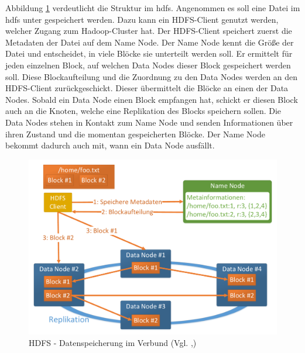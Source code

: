 \noindent
Abbildung \ref{fig:hdfs_cluster_architecture} verdeutlicht die Struktur im \gls{hdfs}. Angenommen es soll eine Datei im \gls{hdfs} unter  gespeichert werden. Dazu kann ein HDFS-Client genutzt werden, welcher Zugang zum Hadoop-Cluster hat. Der HDFS-Client speichert zuerst die Metadaten der Datei auf dem Name Node. Der Name Node kennt die Größe der Datei und entscheidet, in viele Blöcke sie unterteilt werden soll. Er ermittelt für jeden einzelnen Block, auf welchen Data Nodes dieser Block gespeichert werden soll. Diese Blockaufteilung und die Zuordnung zu den Data Nodes werden an den HDFS-Client zurückgeschickt. Dieser übermittelt die Blöcke an einen der Data Nodes. Sobald ein Data Node einen Block empfangen hat, schickt er diesen Block auch an die Knoten, welche eine Replikation des Blocks speichern sollen. Die Data Nodes stehen in Kontakt zum Name Node und senden Informationen über ihren Zustand und die momentan gespeicherten Blöcke. Der Name Node bekommt dadurch auch mit, wann ein Data Node ausfällt.

\begin{figure}[ht]
  \centering
  \includegraphics[width=\textwidth]{./resource/hdfs_cluster_architecture.pdf}
  \caption{HDFS - Datenspeicherung im Verbund (Vgl. \cite{hdfs_architecture},\cite{expert_hadoop_admin})}
  \label{fig:hdfs_cluster_architecture}
\end{figure}

